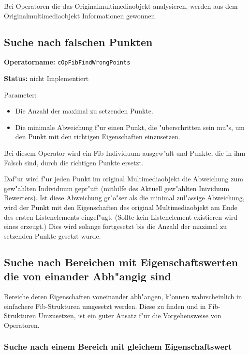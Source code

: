 Bei Operatoren die das Originalmultimediaobjekt analysieren, werden aus dem Originalmultimediaobjekt Informationen gewonnen.


\subsection{Suche nach falschen Punkten}

\textbf{Operatorname:} \verb|cOpFibFindWrongPoints|

\bigskip\noindent
\textbf{Status:} nicht Implementiert

\bigskip\noindent
Parameter:
\begin{itemize}
 \item Die Anzahl der maximal zu setzenden Punkte.
 \item Die minimale Abweichung f"ur einen Punkt, die "uberschritten sein mu"s, um den Punkt mit den richtigen Eigenschaften einzusetzen.
\end{itemize}

\bigskip\noindent
Bei diesem Operator wird ein Fib-Individuum ausgew"alt und Punkte, die in ihm Falsch sind, durch die richtigen Punkte ersetzt.

Daf"ur wird f"ur jeden Punkt im original Multimediaobjekt die Abweichung zum gew"ahlten Individuum gepr"uft (mithilfe des Aktuell gew"ahlten Inividuum Bewerters). Ist diese Abweichung gr"o"ser als die minimal zul"assige Abweichung, wird der Punkt mit den Eigenschaften des original Multimediaobjekt am Ende des ersten Listenelements eingef"ugt. (Sollte kein Listenelement existieren wird eines erzeugt.) Dies wird solange fortgesetzt bis die Anzahl der maximal zu setzenden Punkte gesetzt wurde.


\subsection{Suche nach Bereichen mit Eigenschaftswerten die von einander Abh"angig sind}

Bereiche deren Eigenschaften voneinander abh"angen, k"onnen wahrscheinlich in einfachere Fib-Strukturen umgesetzt werden. Diese zu finden und in Fib-Strukturen Umzusetzen, ist ein guter Ansatz f"ur die Vorgehensweise von Operatoren.


\subsubsection{Suche nach einem Bereich mit gleichem Eigenschaftswert}

